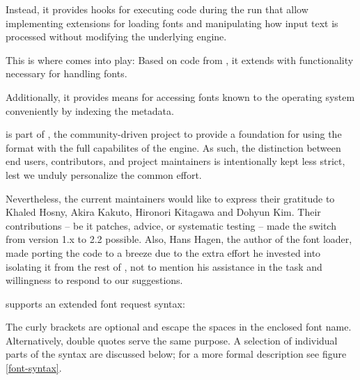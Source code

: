 Instead, it provides hooks for executing \LUA code during the \TEX run
that allow implementing extensions for loading fonts and manipulating
how input text is processed without modifying the underlying engine.

This is where  comes into play:
Based on code from \CONTEXT, it extends \LUATEX with functionality necessary
for handling \OpenType fonts.

Additionally, it provides means for accessing fonts known to the operating
system conveniently by indexing the metadata.

\endsection


 is part of \LUALATEX, the community-driven
project to provide a foundation for using the \LATEX format with the
full capabilites of the \LUATEX engine.
%
As such, the distinction between end users, contributors, and project
maintainers is intentionally kept less strict, lest we unduly
personalize the common effort.

Nevertheless, the current maintainers would like to express their
gratitude to Khaled Hosny, Akira Kakuto, Hironori Kitagawa and Dohyun
Kim.
%
Their contributions -- be it patches, advice, or systematic
testing -- made the switch from version 1.x to 2.2 possible.
%
Also, Hans Hagen, the author of the font loader, made porting the
code to \LATEX a breeze due to the extra effort he invested into
isolating it from the rest of \CONTEXT, not to mention his assistance
in the task and willingness to respond to our suggestions.

\endsection


 supports an extended font request syntax:

\beginnarrower
\endnarrower

\noindent
The curly brackets are optional and escape the spaces in the enclosed
font name.
%
Alternatively, double quotes serve the same purpose.
%
A selection of individual parts of the syntax are discussed below;
for a more formal description see figure \ref{font-syntax}.

